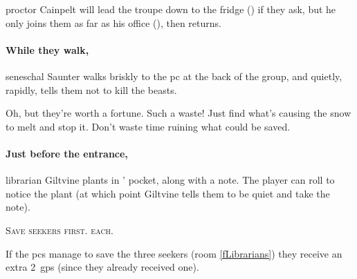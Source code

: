 \Gls{proctor} Cainpelt will lead the troupe down to the fridge () if they ask, but he only joins them as far as his office (), then returns.

\paragraph{While they walk,}
\gls{seneschal} Saunter walks briskly to the \gls{pc} at the back of the group, and quietly, rapidly, tells them not to kill the beasts.

\begin{speechtext}
  \small
  Oh, but they're worth a fortune.
  Such a waste!
  Just find what's causing the snow to melt and stop it.
  Don't waste time ruining what could be saved.
\end{speechtext}

\paragraph{Just before the entrance,}
\gls{librarian} Giltvine plants  in ' pocket, along with a note.
The player can roll  to notice the plant (at which point Giltvine tells them to be quiet and take the note).

\begin{speechtext}
  \scshape
  Save \glspl{seeker} first.
   each.
\end{speechtext}

If the \glspl{pc} manage to save the three \glspl{seeker} (room \vref{fLibrarians}) they receive an extra 2~\glspl{gp} (since they already received one).

